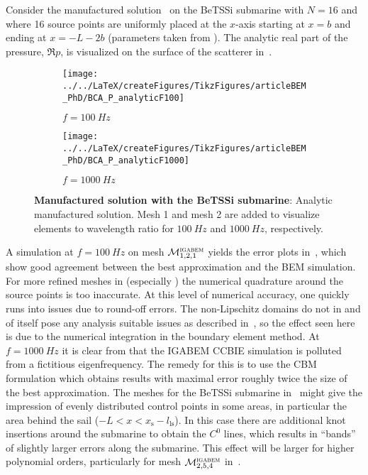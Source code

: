 Consider the manufactured solution~ on the BeTSSi submarine with $N=16$ and where 16 source points are uniformly placed at the $x$-axis starting at $x=b$ and ending at $x=-L-2b$ (parameters taken from ). The analytic real part of the pressure, $\Re{p}$, is visualized on the surface of the scatterer in~. 
\begin{figure}
	\centering
	\begin{subfigure}[t]{\textwidth}
		\texttt{[image: ../../LaTeX/createFigures/TikzFigures/articleBEM\_PhD/BCA\_P\_analyticF100]}
		\caption{$f=\SI{100}{Hz}$}
	\end{subfigure} 
	\par\bigskip
	\begin{subfigure}[t]{\textwidth}
		\texttt{[image: ../../LaTeX/createFigures/TikzFigures/articleBEM\_PhD/BCA\_P\_analyticF1000]}
		\caption{$f=\SI{1000}{Hz}$}
	\end{subfigure} 
	\caption{\textbf{Manufactured solution with the BeTSSi submarine}: Analytic manufactured solution. Mesh 1 and mesh 2 are added to visualize elements to wavelength ratio for $\SI{100}{Hz}$ and $\SI{1000}{Hz}$, respectively.}
	\label{Fig3:BCA_P_analytic}
\end{figure}
A simulation at $f=\SI{100}{Hz}$ on mesh ${\cal M}_{1,2,1}^{\textsc{igabem}}$ yields the error plots in~, which show good agreement between the best approximation and the BEM simulation. For more refined meshes in  (especially ) the numerical quadrature around the source points is too inaccurate. At this level of numerical accuracy, one quickly runs into issues due to round-off errors. The non-Lipschitz domains do not in and of itself pose any analysis suitable issues as described in~, so the effect seen here is due to the numerical integration in the boundary element method. At $f=\SI{1000}{Hz}$ it is clear from  that the IGABEM CCBIE simulation is polluted from a fictitious eigenfrequency. The remedy for this is to use the CBM formulation which obtains results with maximal error roughly twice the size of the best approximation. The meshes for the BeTSSi submarine in~ might give the impression of evenly distributed control points in some areas, in particular the area behind the sail ($-L<x<x_{\mathrm{s}}-l_{\mathrm{ls}}$). In this case there are additional knot insertions around the submarine to obtain the $C^0$ lines, which results in ``bands'' of slightly larger errors along the submarine. This effect will be larger for higher polynomial orders, particularly for mesh ${\cal M}_{2,5,4}^{\textsc{igabem}}$ in~.
